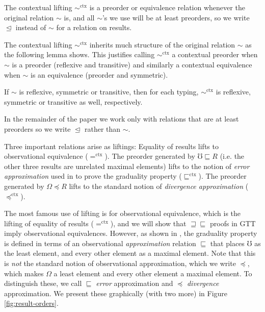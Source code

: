 \documentclass[acmsmall,screen,12pt]{acmart}
\newcommand{\ltdyn}{\sqsubseteq}
\newcommand{\gtdyn}{\sqsupseteq}
\newcommand{\equidyn}{\mathrel{\gtdyn\ltdyn}}
\newcommand{\apreorder}{\trianglelefteq}
\newcommand{\ctxize}[1]{\mathrel{{#1}^{\text{ctx}}}}
\newcommand{\err}{\mho}
\newcommand{\diverge}{\Omega}
\begin{document}
{\begin{shortonly}
The contextual lifting $\ctxize\sim$ is a preorder or equivalence
relation whenever the original relation $\sim$ is, and all $\sim$'s we
use will be at least preorders, so we write $\apreorder$ instead of
$\sim$ for a relation on results.
\end{shortonly}

\begin{longonly}
The contextual lifting $\ctxize\sim$ inherits much structure of the
original relation $\sim$ as the following lemma shows.
%
This justifies calling $\ctxize\sim$ a contextual preorder when $\sim$
is a preorder (reflexive and transitive) and similarly a contextual
equivalence when $\sim$ is an equivalence (preorder and symmetric).
%
\begin{definition}
  If $\sim$ is reflexive, symmetric or transitive, then for each
  typing, $\ctxize\sim$ is reflexive, symmetric or transitive as well,
  respectively.
\end{definition}
In the remainder of the paper we work only with relations that are at
least preorders so we write $\apreorder$ rather than $\sim$.
\end{longonly}

\begin{shortonly}
\noindent Three important relations arise as liftings: Equality of results lifts to observational equivalence
($\ctxize=$).  The preorder generated by $\err \ltdyn R$ (i.e. the other
three results are unrelated maximal elements) lifts to the notion of
\emph{error approximation} used in \citet{newahmed18} to prove the
graduality property ($\ctxize\ltdyn$).  The preorder generated by
$\diverge \preceq R$ lifts to the standard notion of \emph{divergence
  approximation} ($\ctxize\preceq$).
\end{shortonly}

\begin{longonly}
The most famous use of lifting is for observational equivalence,
which is the lifting of equality of results ($\ctxize=$), and we will show that
$\equidyn$ proofs in GTT imply observational equivalences.
%
However, as shown in \citet{newahmed18}, the graduality property is
defined in terms of an observational \emph{approximation} relation
$\ltdyn$ that places $\err$ as the least element, and every other
element as a maximal element.
%
Note that this is \emph{not} the standard notion of observational
approximation, which we write $\preceq$, which makes $\diverge$ a least
element and every other element a maximal element.
%
To distinguish these, we call $\ltdyn$ \emph{error} approximation and
$\preceq$ \emph{divergence} approximation.
%
We present these graphically (with two more) in Figure
\ref{fig:result-orders}.
\end{longonly}

}
\end{document}
